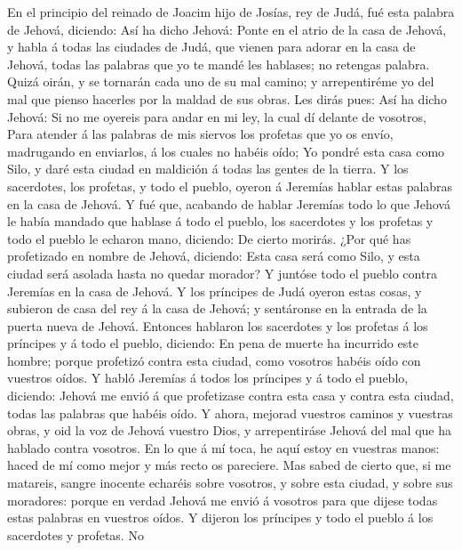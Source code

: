  En el principio del reinado de Joacim hijo de Josías, rey
de Judá, fué esta palabra de Jehová, diciendo:  Así ha dicho
Jehová: Ponte en el atrio de la casa de Jehová, y habla á todas las
ciudades de Judá, que vienen para adorar en la casa de Jehová, todas las
palabras que yo te mandé les hablases; no retengas palabra. 
Quizá oirán, y se tornarán cada uno de su mal camino; y arrepentiréme yo
del mal que pienso hacerles por la maldad de sus obras.  Les
dirás pues: Así ha dicho Jehová: Si no me oyereis para andar en mi ley,
la cual dí delante de vosotros,  Para atender á las palabras
de mis siervos los profetas que yo os envío, madrugando en enviarlos, á
los cuales no habéis oído;  Yo pondré esta casa como Silo, y
daré esta ciudad en maldición á todas las gentes de la tierra.
 Y los sacerdotes, los profetas, y todo el pueblo, oyeron á
Jeremías hablar estas palabras en la casa de Jehová.  Y fué
que, acabando de hablar Jeremías todo lo que Jehová le había mandado que
hablase á todo el pueblo, los sacerdotes y los profetas y todo el pueblo
le echaron mano, diciendo: De cierto morirás.  ¿Por qué has
profetizado en nombre de Jehová, diciendo: Esta casa será como Silo, y
esta ciudad será asolada hasta no quedar morador? Y juntóse todo el
pueblo contra Jeremías en la casa de Jehová.  Y los
príncipes de Judá oyeron estas cosas, y subieron de casa del rey á la
casa de Jehová; y sentáronse en la entrada de la puerta nueva de Jehová.
 Entonces hablaron los sacerdotes y los profetas á los
príncipes y á todo el pueblo, diciendo: En pena de muerte ha incurrido
este hombre; porque profetizó contra esta ciudad, como vosotros habéis
oído con vuestros oídos.  Y habló Jeremías á todos los
príncipes y á todo el pueblo, diciendo: Jehová me envió á que
profetizase contra esta casa y contra esta ciudad, todas las palabras
que habéis oído.  Y ahora, mejorad vuestros caminos y
vuestras obras, y oid la voz de Jehová vuestro Dios, y arrepentiráse
Jehová del mal que ha hablado contra vosotros.  En lo que á
mí toca, he aquí estoy en vuestras manos: haced de mí como mejor y más
recto os pareciere.  Mas sabed de cierto que, si me
matareis, sangre inocente echaréis sobre vosotros, y sobre esta ciudad,
y sobre sus moradores: porque en verdad Jehová me envió á vosotros para
que dijese todas estas palabras en vuestros oídos.  Y
dijeron los príncipes y todo el pueblo á los sacerdotes y profetas. No
